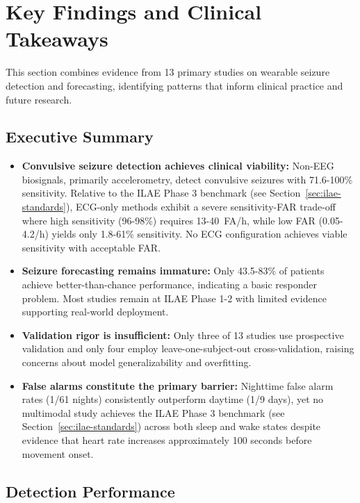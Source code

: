 \section{Key Findings and Clinical Takeaways}

This section combines evidence from 13 primary studies on wearable seizure detection and forecasting, identifying patterns that inform clinical practice and future research.

\subsection{Executive Summary}

\begin{itemize}
    \item \textbf{Convulsive seizure detection achieves clinical viability:} Non-EEG biosignals, primarily accelerometry, detect convulsive seizures with 71.6-100\% sensitivity. Relative to the ILAE Phase 3 benchmark (see Section~\ref{sec:ilae-standards}), ECG-only methods exhibit a severe sensitivity-FAR trade-off where high sensitivity (96-98\%) requires 13-40~FA/h, while low FAR (0.05-4.2/h) yields only 1.8-61\% sensitivity. No ECG configuration achieves viable sensitivity with acceptable FAR.

    \item \textbf{Seizure forecasting remains immature:} Only 43.5-83\% of patients achieve better-than-chance performance, indicating a basic responder problem. Most studies remain at ILAE Phase 1-2 with limited evidence supporting real-world deployment.

    \item \textbf{Validation rigor is insufficient:} Only three of 13 studies use prospective validation and only four employ leave-one-subject-out cross-validation, raising concerns about model generalizability and overfitting.

    \item \textbf{False alarms constitute the primary barrier:} Nighttime false alarm rates (1/61 nights) consistently outperform daytime (1/9 days), yet no multimodal study achieves the ILAE Phase 3 benchmark (see Section~\ref{sec:ilae-standards}) across both sleep and wake states despite evidence that heart rate increases approximately 100 seconds before movement onset.
\end{itemize}

\subsection{Detection Performance}

